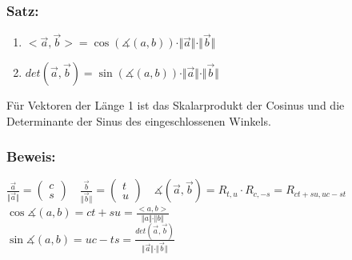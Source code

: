 \subsubsection{Satz:}
\begin{enumerate}
	\item $ <\vec{a},\vec{b}>=\cos(\measuredangle(a,b))\cdot\Vert\vec{a}\Vert
	\cdot\Vert\vec{b}\Vert$
	\item $det(\vec{a},\vec{b})=\sin(\measuredangle(a,b))\cdot\Vert\vec{a}\Vert
	\cdot \Vert\vec{b}\Vert$
\end{enumerate}
Für Vektoren der Länge 1 ist das Skalarprodukt der Cosinus und die Determinante der Sinus des eingeschlossenen Winkels. 
%
%
%
\subsubsection{Beweis:}
$\frac{\vec{a}}{\Vert\vec{a}\Vert}=\begin{pmatrix} c \\ s \end{pmatrix} \quad \frac{\vec{b}}{\Vert\vec{b}\Vert} = \begin{pmatrix} t \\ u \end{pmatrix} \quad \measuredangle(\vec{a},\vec{b})=R_{t,u}\cdot R_{c,-s}=R_{ct+su,uc-st}$\\
$\cos\measuredangle(a,b)=ct+su=\frac{<a,b>}{\Vert a \Vert \cdot \Vert b\Vert}$\\
$\sin\measuredangle(a,b)=uc-ts=\frac{det(\vec{a},\vec{b})}{\Vert\vec{a}\Vert\cdot\Vert\vec{b}\Vert}$
%
%
%
